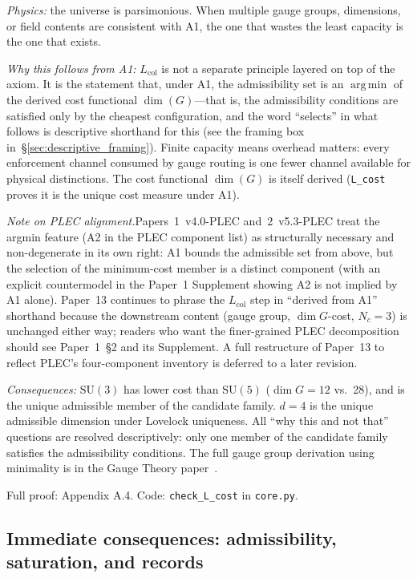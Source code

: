 \documentclass[11pt]{article}
\newcommand{\SU}{\mathrm{SU}}
\DeclareMathOperator*{\argmin}{arg\,min}
\begin{document}
\textit{Physics:} the universe is parsimonious.  When multiple gauge groups, dimensions, or field contents are consistent with A1, the one that wastes the least capacity is the one that exists.

\textit{Why this follows from A1:} $L_{\mathrm{col}}$ is not a separate principle layered on top of the axiom.  It is the statement that, under A1, the admissibility set is an $\argmin$ of the derived cost functional $\dim(G)$---that is, the admissibility conditions are satisfied only by the cheapest configuration, and the word ``selects'' in what follows is descriptive shorthand for this (see the framing box in~\S\ref{sec:descriptive_framing}).  Finite capacity means overhead matters: every enforcement channel consumed by gauge routing is one fewer channel available for physical distinctions.  The cost functional $\dim(G)$ is itself derived (\texttt{L\_cost} proves it is the unique cost measure under A1).

\medskip\noindent\textit{Note on PLEC alignment.}\quad Papers~1~v4.0-PLEC and~2~v5.3-PLEC treat the argmin feature (A2 in the PLEC component list) as structurally necessary and non-degenerate in its own right: A1 bounds the admissible set from above, but the selection of the minimum-cost member is a distinct component (with an explicit countermodel in the Paper~1 Supplement showing A2 is not implied by A1 alone).  Paper~13 continues to phrase the $L_{\mathrm{col}}$ step in ``derived from A1'' shorthand because the downstream content (gauge group, $\dim G$-cost, $N_c=3$) is unchanged either way; readers who want the finer-grained PLEC decomposition should see Paper~1~\S2 and its Supplement.  A full restructure of Paper~13 to reflect PLEC's four-component inventory is deferred to a later revision.

\textit{Consequences:} $\SU(3)$ has lower cost than $\SU(5)$ ($\dim G = 12$ vs.\ 28), and is the unique admissible member of the candidate family.  $d = 4$ is the unique admissible dimension under Lovelock uniqueness.  All ``why this and not that'' questions are resolved descriptively: only one member of the candidate family satisfies the admissibility conditions.  The full gauge group derivation using minimality is in the Gauge Theory paper~\cite{PGT}.

Full proof: Appendix A.4.  Code: \texttt{check\_L\_cost} in \texttt{core.py}.


\subsection{Immediate consequences: admissibility, saturation, and records}
\end{document}
